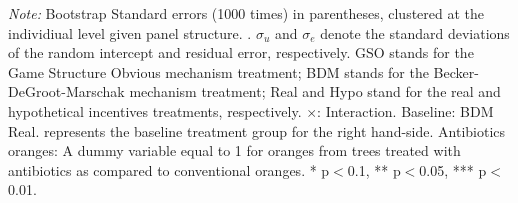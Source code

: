 \documentclass[12pt]{article}
\begin{document}
\begin{table}[H]
\begin{tablenotes}
            \footnotesize
           \item \textit{Note:} Bootstrap Standard errors (1000 times) in parentheses, clustered at the individiual level given panel structure. .  $\sigma_u$ and $\sigma_e$ denote the standard deviations of the random intercept and residual error, respectively.  GSO stands for the Game Structure Obvious mechanism treatment; BDM stands for the Becker-DeGroot-Marschak mechanism treatment; Real and Hypo stand for the real and hypothetical incentives treatments, respectively. $\times$: Interaction. Baseline: BDM Real. represents the baseline treatment group for the right hand-side. Antibiotics oranges: A dummy variable equal to 1 for oranges from trees treated with antibiotics as compared to conventional oranges. * p$<$0.1, ** p$<$0.05, *** p$<$0.01.
        \end{tablenotes}
\end{table}
\end{document}
